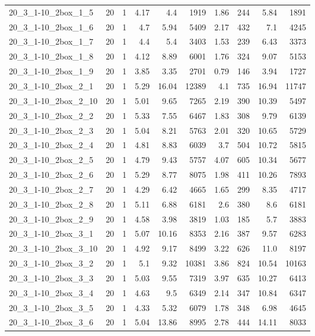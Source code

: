 \begin{center}
\begin{scriptsize}
\begin{longtable}{lrrrrrrrrr}
20\_3\_1-10\_2box\_1\_5 & 20 & 1 & 4.17 & 4.4 & 1919 & 1.86 & 244 & 5.84 & 1891\\
20\_3\_1-10\_2box\_1\_6 & 20 & 1 & 4.7 & 5.94 & 5409 & 2.17 & 432 & 7.1 & 4245\\
20\_3\_1-10\_2box\_1\_7 & 20 & 1 & 4.4 & 5.4 & 3403 & 1.53 & 239 & 6.43 & 3373\\
20\_3\_1-10\_2box\_1\_8 & 20 & 1 & 4.12 & 8.89 & 6001 & 1.76 & 324 & 9.07 & 5153\\
20\_3\_1-10\_2box\_1\_9 & 20 & 1 & 3.85 & 3.35 & 2701 & 0.79 & 146 & 3.94 & 1727\\
20\_3\_1-10\_2box\_2\_1 & 20 & 1 & 5.29 & 16.04 & 12389 & 4.1 & 735 & 16.94 & 11747\\
20\_3\_1-10\_2box\_2\_10 & 20 & 1 & 5.01 & 9.65 & 7265 & 2.19 & 390 & 10.39 & 5497\\
20\_3\_1-10\_2box\_2\_2 & 20 & 1 & 5.33 & 7.55 & 6467 & 1.83 & 308 & 9.79 & 6139\\
20\_3\_1-10\_2box\_2\_3 & 20 & 1 & 5.04 & 8.21 & 5763 & 2.01 & 320 & 10.65 & 5729\\
20\_3\_1-10\_2box\_2\_4 & 20 & 1 & 4.81 & 8.83 & 6039 & 3.7 & 504 & 10.72 & 5815\\
20\_3\_1-10\_2box\_2\_5 & 20 & 1 & 4.79 & 9.43 & 5757 & 4.07 & 605 & 10.34 & 5677\\
20\_3\_1-10\_2box\_2\_6 & 20 & 1 & 5.29 & 8.77 & 8075 & 1.98 & 411 & 10.26 & 7893\\
20\_3\_1-10\_2box\_2\_7 & 20 & 1 & 4.29 & 6.42 & 4665 & 1.65 & 299 & 8.35 & 4717\\
20\_3\_1-10\_2box\_2\_8 & 20 & 1 & 5.11 & 6.88 & 6181 & 2.6 & 380 & 8.6 & 6181\\
20\_3\_1-10\_2box\_2\_9 & 20 & 1 & 4.58 & 3.98 & 3819 & 1.03 & 185 & 5.7 & 3883\\
20\_3\_1-10\_2box\_3\_1 & 20 & 1 & 5.07 & 10.16 & 8353 & 2.16 & 387 & 9.57 & 6283\\
20\_3\_1-10\_2box\_3\_10 & 20 & 1 & 4.92 & 9.17 & 8499 & 3.22 & 626 & 11.0 & 8197\\
20\_3\_1-10\_2box\_3\_2 & 20 & 1 & 5.1 & 9.32 & 10381 & 3.86 & 824 & 10.54 & 10163\\
20\_3\_1-10\_2box\_3\_3 & 20 & 1 & 5.03 & 9.55 & 7319 & 3.97 & 635 & 10.27 & 6413\\
20\_3\_1-10\_2box\_3\_4 & 20 & 1 & 4.63 & 9.5 & 6349 & 2.14 & 347 & 10.84 & 6347\\
20\_3\_1-10\_2box\_3\_5 & 20 & 1 & 4.33 & 5.32 & 6079 & 1.78 & 348 & 6.98 & 4645\\
20\_3\_1-10\_2box\_3\_6 & 20 & 1 & 5.04 & 13.86 & 8995 & 2.78 & 444 & 14.11 & 8033\\

\end{longtable}
\end{scriptsize}
\end{center}
